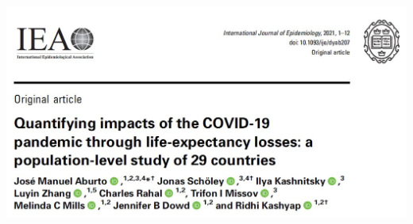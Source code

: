 \documentclass[xcolor={dvipsnames}]{beamer}
\begin{document}
\begin{frame}
	\Large{	
	\begin{center}
		\includegraphics[scale=.45]{Figures/IJE_Aburto}
		
	\end{center}
		}
\end{frame}


\begin{frame}
\begin{center}


\end{center}
\end{frame}
\end{document}
